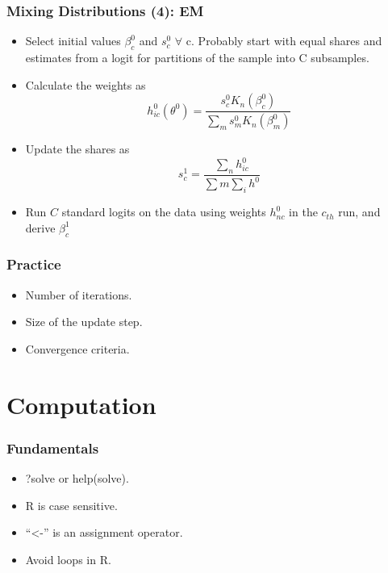 \documentclass{beamer}
\newcommand{\1}{\mathbb{1}}
\begin{document}
\begin{frame}\frametitle{Mixing Distributions (4): EM}
\begin{itemize}
 \item Select initial values $\beta_c^0$ and $s_c^0$ $\forall$ c. Probably start with equal shares and estimates from a logit for partitions of the sample into C subsamples. 
 \item Calculate the weights as 
 \begin{equation}
  h^0_{ic}(\theta^0) = \dfrac{s^{0}_{c} K_n(\beta_c^0)}{\sum_{m} s^0_m K_n(\beta_{m}^0)} 
 \end{equation}
 \item Update the shares as
 \begin{equation}
  s^1_c = \dfrac{\sum_n h^0_{ic}}{\sum m \sum_i h^0_{}}
 \end{equation}
\item Run $C$ standard logits on the data using weights $h^0_{nc}$ in the $c_{th}$ run, and derive $\beta^1_c$
\end{itemize}
\end{frame}

\begin{frame}\frametitle{Practice}
\begin{itemize}
\item Number of iterations.
\item Size of the update step.
\item Convergence criteria. 
\end{itemize}
\end{frame}

\section{Computation}



\begin{frame}\frametitle{Fundamentals}
\begin{itemize}
 \item ?solve or help(solve). 
 \item R is case sensitive. 
 \item ``<-'' is an assignment operator. 
 \item Avoid loops in R. 
\end{itemize}

\end{frame}
\end{document}
